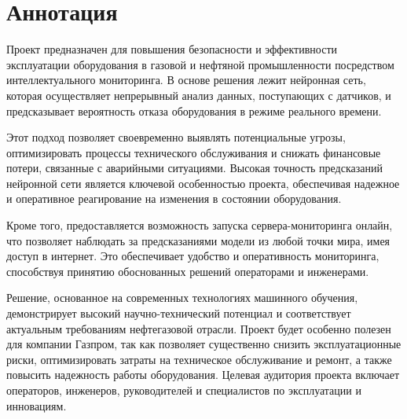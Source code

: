 \documentclass[a4paper,12pt]{article}
\begin{document}
\begin{titlepage}
\end{titlepage}

\newpage
\tableofcontents
\newpage

\newpage
\section{\centering Аннотация}

\begin{flushleft}
Проект предназначен для повышения безопасности и эффективности эксплуатации оборудования в газовой и нефтяной промышленности
посредством интеллектуального мониторинга. В основе решения лежит нейронная сеть, которая осуществляет непрерывный анализ данных,
поступающих с датчиков, и предсказывает вероятность отказа оборудования в режиме реального времени.

Этот подход позволяет своевременно выявлять потенциальные угрозы, оптимизировать процессы технического
обслуживания и снижать финансовые потери, связанные с аварийными ситуациями.
Высокая точность предсказаний нейронной сети является ключевой особенностью проекта,
обеспечивая надежное и оперативное реагирование на изменения в состоянии оборудования.

Кроме того, предоставляется возможность запуска сервера-мониторинга онлайн, что позволяет наблюдать за
предсказаниями модели из любой точки мира, имея доступ в интернет.
Это обеспечивает удобство и оперативность мониторинга, способствуя принятию обоснованных решений операторами и инженерами.

Решение, основанное на современных технологиях машинного обучения, демонстрирует высокий научно-технический потенциал
и соответствует актуальным требованиям нефтегазовой отрасли.
Проект будет особенно полезен для компании Газпром, так как позволяет существенно снизить эксплуатационные риски,
оптимизировать затраты на техническое обслуживание и ремонт, а также повысить надежность работы оборудования.
Целевая аудитория проекта включает операторов, инженеров, руководителей и специалистов по эксплуатации и инновациям.
\end{flushleft}


\newpage
\end{document}
